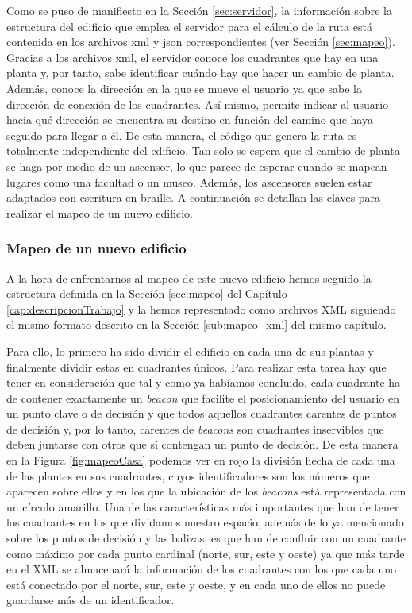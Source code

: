 Como se puso de manifiesto en la Sección \ref{sec:servidor}, la información sobre la estructura del edificio que emplea el servidor para el cálculo de la ruta está contenida en los archivos xml y json correspondientes (ver Sección \ref{sec:mapeo}). Gracias a los archivos xml, el servidor conoce los cuadrantes que hay en una planta y, por tanto, sabe identificar cuándo hay que hacer un cambio de planta. Además, conoce la dirección en la que se mueve el usuario ya que sabe la dirección de conexión de los cuadrantes. Así mismo, permite indicar al usuario hacia qué dirección se encuentra su destino en función del camino que haya seguido para llegar a él. De esta manera, el código que genera la ruta es totalmente independiente del edificio. Tan solo se espera que el cambio de planta se haga por medio de un ascensor, lo que parece de esperar cuando se mapean lugares como una facultad o un museo. Además, los ascensores suelen estar adaptados con escritura en braille. A continuación se detallan las claves para realizar el mapeo de un nuevo edificio.

\subsubsection{Mapeo de un nuevo edificio}

A la hora de enfrentarnos al mapeo de este nuevo edificio hemos seguido la estructura definida en la Sección \ref{sec:mapeo} del Capítulo \ref{cap:descripcionTrabajo} y la hemos representado como archivos XML siguiendo el mismo formato descrito en la Sección \ref{sub:mapeo_xml} del mismo capítulo.

Para ello, lo primero ha sido dividir el edificio en cada una de sus plantas y finalmente dividir estas en cuadrantes únicos. Para realizar esta tarea hay que tener en consideración que tal y como ya habíamos concluido, cada cuadrante ha de contener exactamente un \textit{beacon} que facilite el posicionamiento del usuario en un punto clave o de decisión y que todos aquellos cuadrantes carentes de puntos de decisión y, por lo tanto, carentes de \textit{beacons} son cuadrantes inservibles que deben juntarse con otros que sí contengan un punto de decisión. De esta manera en la Figura \ref{fig:mapeoCasa} podemos ver en rojo la división hecha de cada una de las plantes en sus cuadrantes, cuyos identificadores son los números que aparecen sobre ellos y en los que la ubicación de los \textit{beacons} está representada con un círculo amarillo. Una de las características más importantes que han de tener los cuadrantes en los que dividamos nuestro espacio, además de lo ya mencionado sobre los puntos de decisión y las balizas, es que han de confluir con un cuadrante como máximo por cada punto cardinal (norte, sur, este y oeste) ya que más tarde en el XML se almacenará la información de los cuadrantes con los que cada uno está conectado por el norte, sur, este y oeste, y en cada uno de ellos no puede guardarse más de un identificador.

